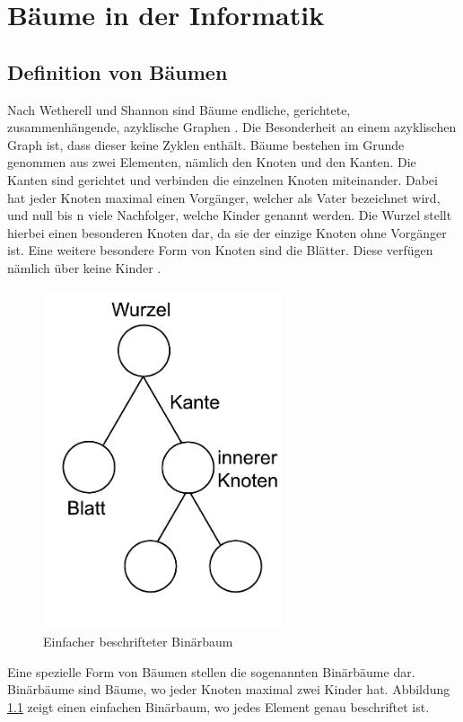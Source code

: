 \chapter{Bäume in der Informatik}
\label{chap:kapitel2}

\section{Definition von Bäumen}

Nach Wetherell und Shannon sind Bäume endliche, gerichtete, zusammenhängende, azyklische Graphen \cite[]{q1}. 
Die Besonderheit an einem azyklischen Graph ist, dass dieser keine Zyklen enthält. Bäume bestehen im Grunde genommen 
aus zwei Elementen, nämlich den Knoten und den Kanten. Die Kanten sind gerichtet und verbinden die einzelnen 
Knoten miteinander. Dabei hat jeder Knoten maximal einen Vorgänger, welcher als Vater bezeichnet wird, und null 
bis n viele Nachfolger, welche Kinder genannt werden. Die Wurzel stellt hierbei einen besonderen Knoten dar, da sie der 
einzige Knoten ohne Vorgänger ist. Eine weitere besondere Form von Knoten sind die Blätter. Diese verfügen nämlich über 
keine Kinder \cite{q4}.

\begin{figure}
    \centering
    \includegraphics[width=7cm, height=10cm]{abbildungen/simple_tree}
    \caption{Einfacher beschrifteter Binärbaum}
    \label{pic:simple_tree} 
\end{figure}

Eine spezielle Form von Bäumen stellen die sogenannten Binärbäume dar. 
Binärbäume sind Bäume, wo jeder Knoten maximal zwei Kinder hat. Abbildung \ref{pic:simple_tree} 
zeigt einen einfachen Binärbaum, wo jedes Element genau beschriftet ist. 

